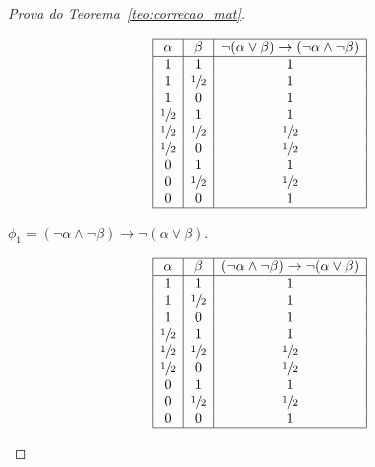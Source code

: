 \begin{proof}[Prova do Teorema~\ref{teo:correcao_mat}]
\begin{provaporcasos}
\begin{provaporsubcasos}
                \begin{center}
                    \[
                        \begin{array}{|c|c|c|}%
                            \hline%
                            \alpha      & \beta & \neg (\alpha \lor \beta) \to (\neg \alpha \land \neg \beta) \\
                            \hline%
                            1 & 1 & 1\\
                            1 & \meio{} & 1\\
                            1 & 0 & 1\\
                            \meio{} & 1 & 1\\
                            \meio{} & \meio{} &\meio{}\\ 
                            \meio{} & 0 & \meio{}\\
                            0 & 1 & 1\\
                            0 & \meio{} & \meio{}\\
                            0 & 0 & 1\\
                            \hline%
                        \end{array}
                    \]
                \end{center}
                
                   

                \subcasodeprova{} $\phi_{1} = (\neg \alpha \land \neg \beta) \to \neg (\alpha \lor \beta)$.

                \begin{center}
                    \[
                        \begin{array}{|c|c|c|}%
                            \hline%
                            \alpha      & \beta & (\neg \alpha \land \neg \beta) \to \neg (\alpha \lor \beta) \\
                            \hline%
                            1 & 1 & 1\\
                            1 & \meio{} & 1\\
                            1 & 0 & 1\\
                            \meio{} & 1 & 1\\
                            \meio{} & \meio{} &\meio{}\\ 
                            \meio{} & 0 & \meio{}\\
                            0 & 1 & 1\\
                            0 & \meio{} & \meio{}\\
                            0 & 0 & 1\\
                            \hline%
                        \end{array}
                    \]
                \end{center}


\end{provaporsubcasos}
\end{provaporcasos}
\end{proof}
